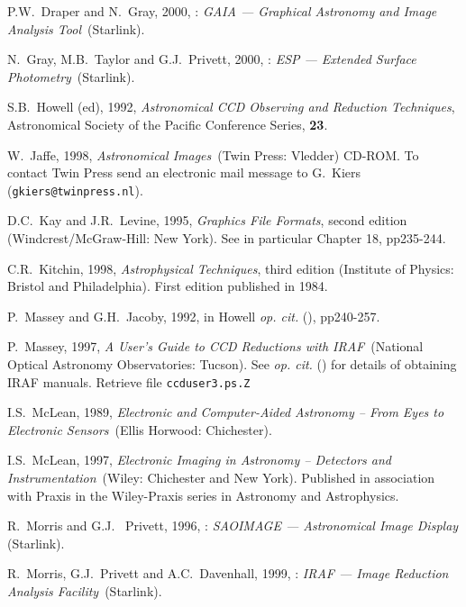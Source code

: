 \documentclass[twoside,11pt]{starlink}
\begin{document}
\begin{thebibliography}{99}
   P.W.~Draper and N.~Gray, 2000,
   : \textit{GAIA --- Graphical Astronomy and Image
   Analysis Tool}\, (Starlink).

   N.~Gray, M.B.~Taylor and G.J.~Privett, 2000,
   : \textit{ESP --- Extended Surface Photometry}\,
   (Starlink).

   S.B.~Howell (ed), 1992, \textit{Astronomical CCD
   Observing and Reduction Techniques}, Astronomical Society of the
   Pacific Conference Series, \textbf{23}.

   W.~Jaffe, 1998, \textit{Astronomical Images}\,
   (Twin Press: Vledder) CD-ROM.  To contact Twin Press send an electronic
   mail message to G.~Kiers (\texttt{gkiers@twinpress.nl}).

   D.C.~Kay and J.R.~Levine, 1995, \textit{Graphics File
   Formats}, second edition
  \newline (Windcrest/McGraw-Hill: New York).  See in particular
   Chapter 18, pp235-244.

   C.R.~Kitchin, 1998, \textit{Astrophysical Techniques},
   third edition (Institute of Physics: Bristol and Philadelphia).
   First edition published in 1984.

   P.~Massey and G.H.~Jacoby, 1992, in Howell
   \textit{op. cit.}\/ (\cite{HOWELL92}), pp240-257.

   P.~Massey, 1997, \textit{A User's Guide to CCD
   Reductions with IRAF}\, (National Optical Astronomy Observatories:
   Tucson).  See  \textit{op. cit.}\/ (\cite{SG12}) for
   details of obtaining IRAF manuals.  Retrieve file \texttt{ccduser3.ps.Z}

   I.S.~McLean, 1989, \textit{Electronic and Computer-Aided
   Astronomy -- From Eyes to Electronic Sensors}\, (Ellis Horwood:
   Chichester).

   I.S.~McLean, 1997, \textit{Electronic Imaging in
   Astronomy -- Detectors and Instrumentation}\, (Wiley: Chichester and
   New York).  Published in association with Praxis in the Wiley-Praxis
   series in Astronomy and Astrophysics.

   R.~Morris and G.J.~ Privett, 1996,
   : \textit{SAOIMAGE --- Astronomical Image
   Display}\, (Starlink).

   R.~Morris, G.J.~Privett and A.C.~Davenhall, 1999,
   : \textit{IRAF --- Image Reduction Analysis Facility}\,
   (Starlink).


\end{thebibliography}
\end{document}

